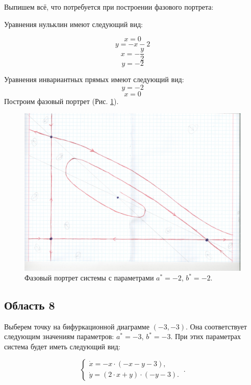 Выпишем всё, что потребуется при построении фазового портрета:

Уравнения нульклин имеют следующий вид: 

$$x=0$$
$$y=- x - 2$$
$$x=- \frac{y}{2}$$
$$y=-2$$


Уравнения инвариантных прямых имеют следующий вид: 
$$y = -2$$
$$x = 0$$
Построим фазовый портрет (Рис. \ref{fig:phportr7}).

\begin{figure}[h]
	
	\includegraphics[width=\textwidth]{phptr/(-20, -7).jpeg}
	\centering
	\caption{\label{fig:phportr7} Фазовый портрет системы с параметрами $a^\ast = -2$, $b^\ast = -2$.}
	
\end{figure}

\subsection{Область 8}

Выберем точку на бифуркационной диаграмме $(-3, -3)$. Она соответствует следующим значениям параметров:  $a^\ast = -3$, $b^\ast = -3$. При этих параметрах система будет иметь следующий вид: 

$$
\left \lbrace 
\begin{matrix} 
	\dot{x} = -x \cdot (-x - y - 3), \\
	\dot{y} = (2 \cdot x + y) \cdot (-y - 3). \
\end{matrix} 
\right . .$$


